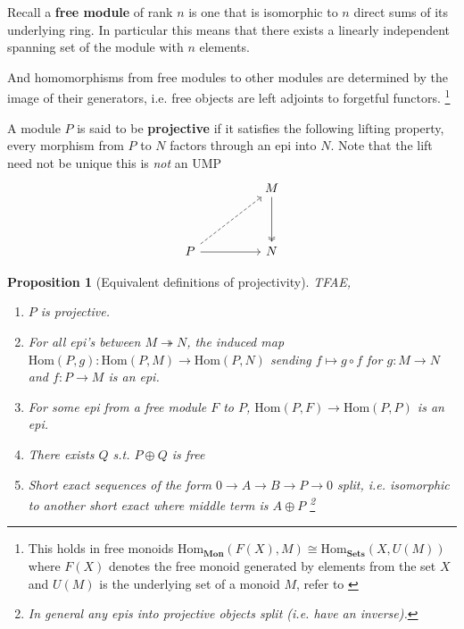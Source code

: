 \documentclass[12pt]{article}
\numberwithin{equation}{section}
\newcommand{\Hom}{{\mathrm{Hom}}}
\newcounter{dummy} \numberwithin{dummy}{section}
\newtheorem{proposition}[dummy]{Proposition}
\begin{document}
	Recall a\textbf{ free module } of rank $n$ is one that is isomorphic to $n$ direct sums of its underlying ring. In particular this means that there exists a linearly independent spanning set of the module with $n$ elements.
	
	And homomorphisms from free modules to other modules are determined by the image of their generators, i.e. free objects are left adjoints to forgetful functors. \footnote{This holds in free monoids $\mathrm{Hom}_\mathbf{Mon}(F(X), M) \cong \mathrm{Hom}_\mathbf{Sets} (X, U(M))$ where $F(X)$ denotes the free monoid generated by elements from the set $X$ and $U(M)$ is the underlying set of a monoid $M$, refer to \cite[p. ~208]{Awodey} }
	
	A module $P$ is said to be \textbf{projective} if it satisfies the following lifting property, every morphism from $P$ to $N$ factors through an epi into $N$. Note that the lift need not be unique this is \textit{not} an UMP
	\[\begin{tikzcd}
		&& M \\
		\\
		P && N
		\arrow[two heads, from=1-3, to=3-3]
		\arrow[from=3-1, to=3-3]
		\arrow[dashed, from=3-1, to=1-3]
	\end{tikzcd}\]
	
	
	
	\begin{proposition}[Equivalent definitions of projectivity]\label{projtfae}
		TFAE,
		\begin{enumerate}
			\item $P$ is projective.
			\item For all epi's between $M\twoheadrightarrow N$, the induced map $\Hom(P,g):\mathrm{Hom}(P,M) \to \mathrm{Hom}(P,N)$ sending $f \mapsto g \circ f$ for $g:M \to N$ and $f:P \to M$ is an epi.
			\item For some epi from a free module $F$ to $P$, $\mathrm{Hom}(P,F) \to \mathrm{Hom}(P,P)$ is an epi.
			\item There exists $Q$ s.t. $P \oplus Q$ is free
			\item Short exact sequences of the form $0 \to A \to B \to P \to 0$ split, i.e. isomorphic to another short exact where middle term is $A \oplus P$ \footnote{In general any epis into projective objects split (i.e. have an inverse).}
		\end{enumerate}
	\end{proposition}
	
\end{document}

